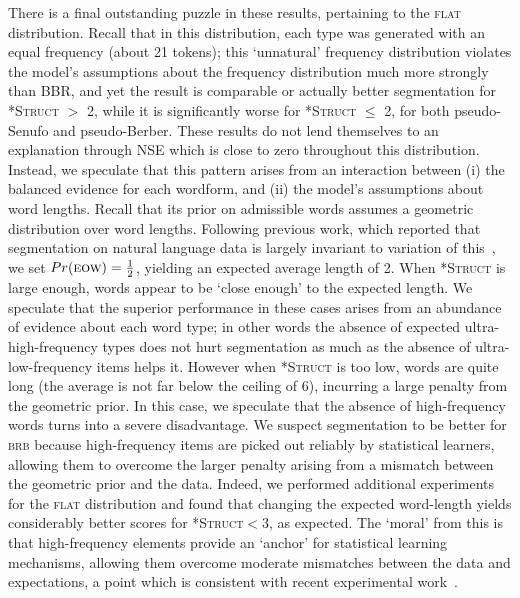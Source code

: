 \documentclass[11pt]{article}
\begin{document}
There is a final outstanding puzzle in these results, pertaining to the \textsc{flat} distribution. Recall that in this distribution, each type was generated with an equal frequency (about 21 tokens); this `unnatural' frequency distribution violates the model's assumptions about the frequency distribution much more strongly than \textsc{BBR}, and yet the result is comparable or actually better segmentation for \textsc{*Struct} $>$ 2, while it is significantly worse for \textsc{*Struct} $\leq$ 2, for both pseudo-Senufo and pseudo-Berber. These results do not lend themselves to an explanation through NSE which is close to zero throughout this distribution. Instead, we speculate that this pattern arises from an interaction between (i) the balanced evidence for each wordform, and (ii) the model's assumptions about word lengths. Recall that its prior on admissible words assumes a geometric distribution over word lengths. Following previous work, which reported that segmentation on natural language data is largely invariant to variation of this~\cite{Goldwater09a}, we set $Pr(\textsc{eow}) = \frac{1}{2}$, yielding an expected average length of 2. When \textsc{*Struct} is large enough, words appear to be `close enough' to the expected length. We speculate that the superior performance in these cases arises from an abundance of evidence about each word type; in other words the absence of expected ultra-high-frequency types does not hurt segmentation as much as the absence of ultra-low-frequency items helps it. However when \textsc{*Struct} is too low, words are quite long (the average is not far below the ceiling of 6), incurring a large penalty from the geometric prior. In this case, we speculate that the absence of high-frequency words turns into a severe disadvantage. We suspect segmentation to be better for \textsc{brb} because high-frequency items are picked out reliably by statistical learners, allowing them to overcome the larger penalty arising from a mismatch between the geometric prior and the data. Indeed, we performed additional experiments for the \textsc{flat} distribution and found that changing the expected word-length yields considerably better scores for \textsc{*Struct}$<$3, as expected.%
The `moral' from this is that high-frequency elements provide an `anchor' for statistical learning mechanisms, allowing them overcome moderate mismatches between the data and expectations, a point which is consistent with recent experimental work~\cite{Kurumada13a}.
\end{document}
